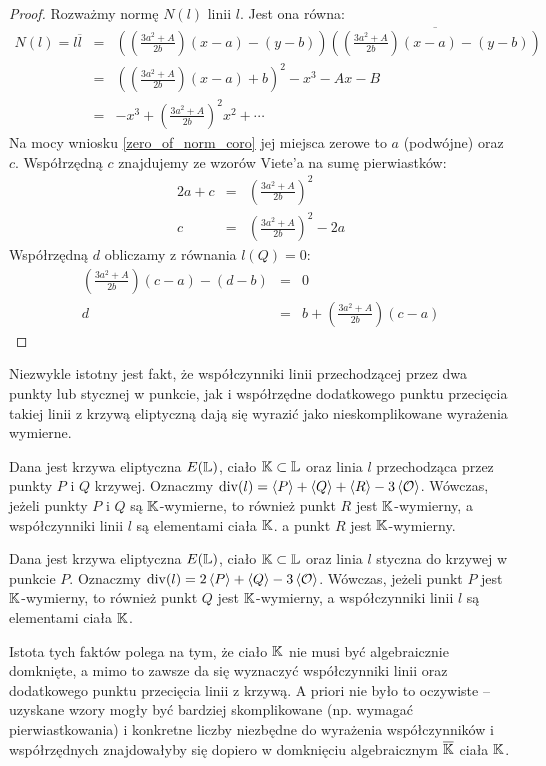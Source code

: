 \begin{proof}
Rozważmy normę $N(l)$ linii $l$. Jest ona równa:
\begin{eqnarray*}
N(l) = l\overline{l}
& = & \left(\left(\frac{3a^2 + A}{2b}\right)(x - a) - (y - b)\right)
      \overline{
      \left(\left(\frac{3a^2 + A}{2b}\right)(x - a) - (y - b)\right)
      } \\
& = & \left(\left(\frac{3a^2+A}{2b}\right)(x-a) + b\right)^2 - x^3 - Ax - B \\
& = & -x^3 + \left(\frac{3a^2+A}{2b}\right)^2x^2 + \cdots
\end{eqnarray*}
Na mocy wniosku \ref{zero_of_norm_coro}
jej miejsca zerowe to $a$ (podwójne) oraz $c$.
Współrzędną $c$ znajdujemy ze wzorów Viete'a na sumę pierwiastków:
\begin{eqnarray*}
2a + c & = & \left(\frac{3a^2+A}{2b}\right)^2 \\
     c & = & \left(\frac{3a^2+A}{2b}\right)^2 - 2a
\end{eqnarray*}
Współrzędną $d$ obliczamy z równania $l(Q) = 0$:
\begin{eqnarray*}
\left(\frac{3a^2 + A}{2b}\right)(c - a) - (d - b) & = & 0 \\
d & = & b + \left(\frac{3a^2 + A}{2b}\right)(c - a)
\end{eqnarray*}
\end{proof}

Niezwykle istotny jest fakt,
że współczynniki linii przechodzącej przez dwa punkty
lub stycznej w punkcie,
jak i współrzędne dodatkowego punktu przecięcia
takiej linii z krzywą eliptyczną dają się wyrazić
jako nieskomplikowane wyrażenia wymierne.

\begin{fact}
Dana jest krzywa eliptyczna $E(\mathbb{L})$, ciało $\mathbb{K} \subset \mathbb{L}$
oraz linia $l$ przechodząca przez punkty $P$ i $Q$ krzywej.
Oznaczmy $\operatorname{div}(l) = \left\langle P\right\rangle + \left\langle Q\right\rangle + \left\langle R\right\rangle - 3\left\langle\mathcal{O}\right\rangle$.
Wówczas, jeżeli punkty $P$ i $Q$ są $\mathbb{K}$-wymierne,
to również punkt $R$ jest $\mathbb{K}$-wymierny,
a współczynniki linii $l$ są elementami ciała $\mathbb{K}$.
a punkt $R$ jest $\mathbb{K}$-wymierny.
\end{fact}

\begin{fact}
Dana jest krzywa eliptyczna $E(\mathbb{L})$, ciało $\mathbb{K} \subset \mathbb{L}$
oraz linia $l$ styczna do krzywej w punkcie $P$.
Oznaczmy $\operatorname{div}(l) = 2\left\langle P\right\rangle + \left\langle Q\right\rangle - 3\left\langle\mathcal{O}\right\rangle$.
Wówczas, jeżeli punkt $P$ jest $\mathbb{K}$-wymierny,
to również punkt $Q$ jest $\mathbb{K}$-wymierny,
a współczynniki linii $l$ są elementami ciała $\mathbb{K}$.
\end{fact}

Istota tych faktów polega na tym,
że ciało $\mathbb{K}$ nie musi być algebraicznie domknięte,
a mimo to zawsze da się wyznaczyć współczynniki linii
oraz dodatkowego punktu przecięcia linii z krzywą.
A priori nie było to oczywiste --
uzyskane wzory mogły być bardziej skomplikowane (np. wymagać pierwiastkowania)
i konkretne liczby niezbędne do wyrażenia współczynników i współrzędnych
znajdowałyby się dopiero w domknięciu algebraicznym $\overline{\mathbb{K}}$
ciała $\mathbb{K}$.
